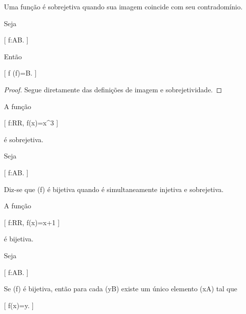 \documentclass[../../main]{subfiles}
\begin{document}
\begin{obs}

	Uma função é sobrejetiva quando sua imagem coincide com seu
	contradomínio.

\end{obs}

\begin{prop}
	\label{prop:matematica:funcoes:tipos-de-funcoes:caracterizacao-sobrejetiva}

	Seja

		[
			f:A\to B.
		]

	Então

	[
	f
	\iff
	(f)=B.
	]

\end{prop}

\begin{proof}

	Segue diretamente das definições de imagem e sobrejetividade.

\end{proof}

\begin{ex}

	A função

	[
	f:\mathbb R\to\mathbb R,
	\qquad
	f(x)=x^3
	]

	é sobrejetiva.

\end{ex}

\begin{defn}
	\label{def:matematica:funcoes:tipos-de-funcoes:bijetiva}

	Seja

		[
			f:A\to B.
		]

	Diz-se que (f) é bijetiva quando é simultaneamente injetiva e
	sobrejetiva.

\end{defn}

\begin{ex}

	A função

	[
	f:\mathbb R\to\mathbb R,
	\qquad
	f(x)=x+1
	]

	é bijetiva.

\end{ex}

\begin{prop}
	\label{prop:matematica:funcoes:tipos-de-funcoes:bijetiva-unica}

	Seja

		[
			f:A\to B.
		]

	Se (f) é bijetiva, então para cada
	(y\in B) existe um único elemento
	(x\in A) tal que

		[
			f(x)=y.
		]

\end{prop}
\end{document}
